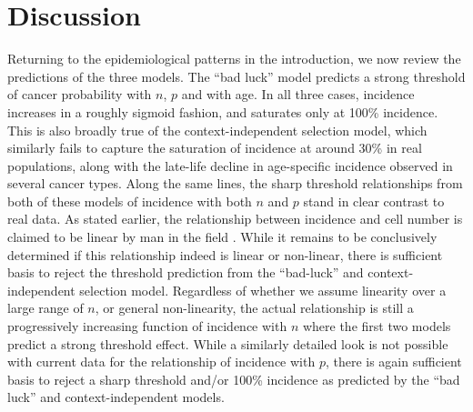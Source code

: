 \documentclass[9pt,twocolumn,twoside]{pnas-new}
\begin{document}
\section*{Discussion}
Returning to the epidemiological patterns in the introduction, we now review the predictions of the three models. The ``bad luck'' model predicts a strong threshold of cancer probability with $n$, $p$ and with age. In all three cases, incidence increases in a roughly sigmoid fashion, and saturates only at 100\% incidence. This is also broadly true of the context-independent selection model, which similarly fails to capture the saturation of incidence at around 30\% in real populations, along with the late-life decline in age-specific incidence observed in several cancer types. Along the same lines, the sharp threshold relationships from both of these models of incidence with both $n$ and $p$ stand in clear contrast to real data. As stated earlier, the relationship between incidence and cell number is claimed to be linear by man in the field \cite{Tomasetti78, Tomasetti2017}. While it remains to be conclusively determined if this relationship indeed is linear or non-linear, there is sufficient basis to reject the threshold prediction from the ``bad-luck'' and context-independent selection model. Regardless of whether we assume linearity over a large range of $n$, or general non-linearity, the actual relationship is still a progressively increasing function of incidence with $n$ where the first two models predict a strong threshold effect. While a similarly detailed look is not possible with current data for the relationship of incidence with $p$, there is again sufficient basis to reject a sharp threshold and/or 100\% incidence as predicted by the ``bad luck'' and context-independent models.
\end{document}
